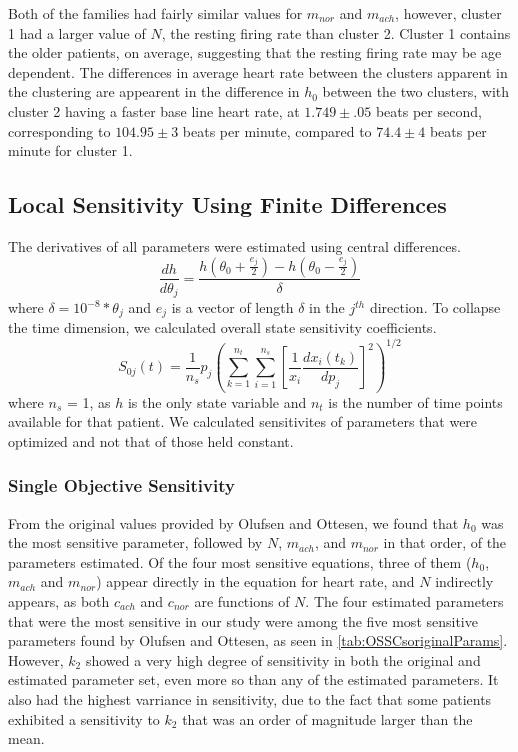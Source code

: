 \documentclass[fleqn,10pt]{wlscirep}
\begin{document}
Both of the families had fairly similar values for $m_{nor}$ and $m_{ach}$, however, cluster 1 had a larger value of $N$, the resting firing rate than cluster 2. Cluster 1 contains the older patients, on average, suggesting that the resting firing rate may be age dependent. The differences in average heart rate between the clusters apparent in the clustering are appearent in the difference in $h_0$ between the two clusters, with cluster 2 having a faster base line heart rate, at $1.749 \pm .05$ beats per second, corresponding to $104.95 \pm 3$ beats per minute, compared to $74.4 \pm 4$ beats per minute for cluster 1.
 
\subsection*{Local Sensitivity Using Finite Differences}
The derivatives of all parameters were estimated using central differences. 
\begin{equation}
\frac{dh}{d\theta_j} = \frac{h(\theta_0+\frac{e_j}{2})-h(\theta_0-\frac{e_j}{2})}{\delta}
\end{equation}
where $\delta=10^{-8}*\theta_j$ and $e_j$ is a vector of length $\delta$ in the $j^{th}$ direction.
To collapse the time dimension, we calculated overall state sensitivity coefficients. \cite{stelling2004robustness}
\begin{equation}
S_{0j}(t) = \frac{1}{n_s}p_j \left(\sum_{k=1}^{n_t} \sum_{i=1}^{n_s} \left[ \frac{1}{x_i} \frac{dx_i(t_k)}{dp_j} \right]^2 \right)^{1/2}
\end{equation}
where $n_s$ = 1, as $h$ is the only state variable and $n_t$ is the number of time points available for that patient. We calculated sensitivites of parameters that were optimized and not that of those held constant.
\subsubsection*{Single Objective Sensitivity}
From the original values provided by Olufsen and Ottesen, we found that $h_0$ was the most sensitive parameter, followed by $N$, $m_{ach}$, and $m_{nor}$ in that order, of the parameters estimated. Of the four most sensitive equations, three of them ($h_0$, $m_{ach}$ and $m_{nor}$) appear directly in the equation for heart rate, and $N$ indirectly appears, as both $c_{ach}$ and $c_{nor}$ are functions of $N$.
The four estimated parameters that were the most sensitive in our study were among the five most sensitive parameters found by Olufsen and Ottesen, as seen in \ref{tab:OSSCsoriginalParams}. However, $k_2$ showed a very high degree of sensitivity in both the original and estimated parameter set, even more so than any of the estimated parameters. It also had the highest varriance in sensitivity, due to the fact that some patients exhibited a sensitivity to $k_2$ that was an order of magnitude larger than the mean. 
\end{document}
